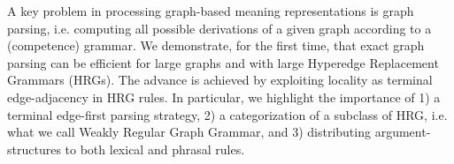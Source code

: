 A key problem in processing graph-based meaning representations is graph parsing, i.e. computing all possible derivations of a given graph according to a (competence) grammar. We demonstrate, for the first time, that exact graph parsing can be efficient for large graphs and with large Hyperedge Replacement Grammars (HRGs). The advance is achieved by exploiting locality as terminal edge-adjacency in HRG rules. In particular, we highlight the importance of 1) a terminal edge-first parsing strategy, 2) a categorization of a subclass of HRG, i.e. what we call Weakly Regular Graph Grammar,  and 3) distributing argument-structures to both lexical and phrasal rules.
